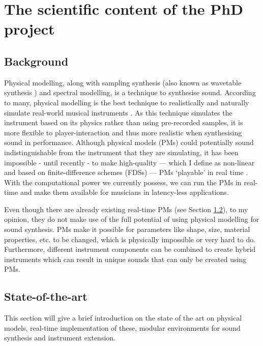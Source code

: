\section{The scientific content of the PhD project}

\subsection{Background}
Physical modelling, along with sampling synthesis (also known as wavetable synthesis \cite{Smith2010a}) and spectral modelling, is a technique to synthesise sound. According to many, physical modelling is the best technique to realistically and naturally simulate real-world musical instruments \cite{Valimaki2006, Smith2010b, Bilbao2009}. As this technique simulates the instrument based on its physics rather than using pre-recorded samples, it is more flexible to player-interaction and thus more realistic when synthesising sound in performance. Although physical models (PMs) could potentially sound indistinguishable from the instrument that they are simulating, it has been impossible - until recently - to make high-quality — which I define as non-linear and based on finite-difference schemes (FDSs) — PMs ‘playable’ in real time \cite{Smith2010a}. With the computational power we currently possess, we can run the PMs in real-time and make them available for musicians in latency-less applications.

Even though there are already existing real-time PMs (see Section \ref{SOTA}), to my opinion, they do not make use of the full potential of using physical modelling for sound synthesis. PMs make it possible for parameters like shape, size, material properties, etc. to be changed, which is physically impossible or very hard to do. Furthermore, different instrument components can be combined to create hybrid instruments which can result in unique sounds that can only be created using PMs.

\subsection{State-of-the-art}\label{SOTA}
This section will give a brief introduction on the state of the art on physical models, real-time implementation of these, modular environments for sound synthesis and instrument extension.

